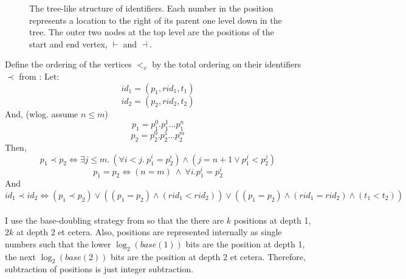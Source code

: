 \documentclass[diss.tex]{subfiles}
\begin{document}
\begin{figure}[H]
\centering
{}
\caption{The tree-like structure of identifiers. Each number in the position represents a location to the right of its parent one level down in the tree. The outer two nodes at the top level are the positions of the start and end vertex, $\vdash$ and $\dashv$.}
\label{fig:tree}
\end{figure}
%
%
%
%
Define the ordering of the vertices $<_v$ by the total ordering on their identifiers $\prec$ from \cite{logoot}: 
Let: $$id_1 = (p_1, rid_1, t_1)$$ $$id_2 = (p_2, rid_2, t_2)$$
And, (wlog. assume $n \leq m$)
$$ p_1 = p_1^0.p_1^1...p_1^n$$ $$p_2 = p_2^0.p_2^1...p_2^m$$
Then, 
$$ p_1 \prec p_2 \Leftrightarrow \exists j \leq m.~ (\forall i<j.~ p_1^i = p_2^i) \wedge (j=n+1 \vee p_1^j < p_2^j)$$
$$ p_1 = p_2 \Leftrightarrow (n=m)~ \wedge~ \forall i. p_1^i = p_2^i$$
And $$id_1 \prec id_2 \Leftrightarrow (p_1 \prec p_2) \vee ((p_1 = p_2) \wedge (rid_1 < rid_2)) \vee ((p_1 = p_2) \wedge (rid_1 = rid_2) \wedge (t_1 < t_2))$$
\\
I use the base-doubling strategy from \cite{logoot} so that the there are $k$ positions at depth 1, $2k$ at depth 2 et cetera. Also, positions are represented internally as single numbers such that the lower $\log_2(base(1))$ bits are the position at depth 1, the next $\log_2(base(2))$ bits are the position at depth 2 et cetera. Therefore, subtraction of positions is just integer subtraction.
\\\\
\end{document}
